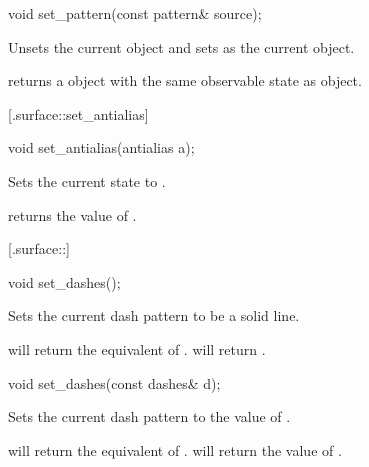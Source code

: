 \begin{itemdecl}
void set_pattern(const pattern& source);
\end{itemdecl}
\begin{itemdescr}
	\pnum
	\effects
	Unsets the current  object and sets  as the current  object.
	
	\pnum
	\postconditions
	 returns a  object with the same observable state as  object.
\end{itemdescr}

 [\iotwod.surface::set_antialias] {}

%
%
\begin{itemdecl}
void set_antialias(antialias a);
\end{itemdecl}
\begin{itemdescr}
	\pnum
	\effects
	Sets the current  state to .
	
	\pnum
	\postconditions
	 returns the value of .
\end{itemdescr}

 [\iotwod.surface::] {}

%
%
\begin{itemdecl}
void set_dashes();
\end{itemdecl}
\begin{itemdescr}
	\pnum
	\effects
	Sets the current dash pattern to be a solid line.
	
	\pnum
	\postconditions
	 will return the equivalent of .  will return .
\end{itemdescr}

\begin{itemdecl}
void set_dashes(const dashes& d);
\end{itemdecl}
\begin{itemdescr}
	\pnum
	\effects
	Sets the current dash pattern to the value of .
	
	\pnum
	\postconditions
	 will return the equivalent of .  will return the value of .
\end{itemdescr}

